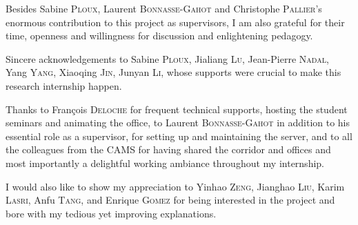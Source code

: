 \begin{acknowledgements}
    \addchaptertocentry{\acknowledgementname} %
    \vfil
    Besides Sabine \textsc{Ploux}, Laurent \textsc{Bonnasse-Gahot} and Christophe \textsc{Pallier}'s enormous contribution to this project as supervisors, I am also grateful for their time, openness and willingness for discussion and enlightening pedagogy.
    
    Sincere acknowledgements to Sabine \textsc{Ploux}, Jialiang \textsc{Lu}, Jean-Pierre \textsc{Nadal}, Yang \textsc{Yang}, Xiaoqing \textsc{Jin}, Junyan \textsc{Li}, whose supports were crucial to make this research internship happen. 

    Thanks to François \textsc{Deloche} for frequent technical supports, hosting the student seminars and animating the office, to Laurent \textsc{Bonnasse-Gahot} in addition to his essential role as a supervisor, for setting up and maintaining the server, and to all the colleagues from the CAMS for having shared the corridor and offices and most importantly a delightful working ambiance throughout my internship.

    I would also like to show my appreciation to Yinhao \textsc{Zeng}, Jianghao \textsc{Liu}, Karim \textsc{Lasri}, Anfu \textsc{Tang}, and Enrique \textsc{Gomez} for being interested in the project and bore with my tedious yet improving explanations. 
\end{acknowledgements}

\cleardoublepage